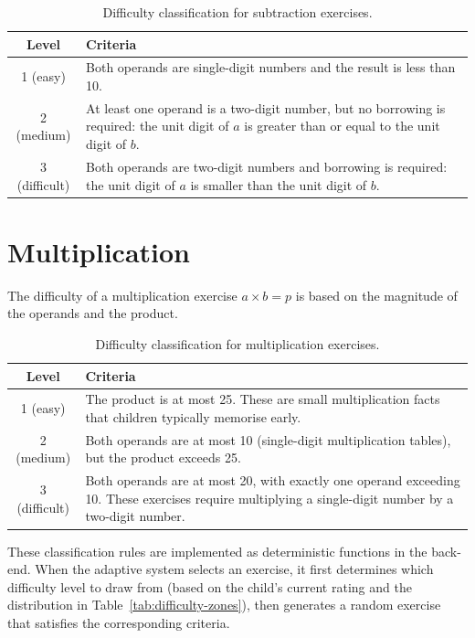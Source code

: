 \begin{table}[ht]
\centering
\begin{tabular}{cp{10cm}}
\toprule
Level & Criteria \\
\midrule
1 (easy) & Both operands are single-digit numbers and the result is less than 10. \\
2 (medium) & At least one operand is a two-digit number, but no borrowing is required: the unit digit of $a$ is greater than or equal to the unit digit of $b$. \\
3 (difficult) & Both operands are two-digit numbers and borrowing is required: the unit digit of $a$ is smaller than the unit digit of $b$. \\
\bottomrule
\end{tabular}
\caption{Difficulty classification for subtraction exercises.}
\label{tab:diff-subtraction}
\end{table}

\section{Multiplication}

The difficulty of a multiplication exercise $a \times b = p$ is based on the magnitude of the operands and the product.

\begin{table}[ht]
\centering
\begin{tabular}{cp{10cm}}
\toprule
Level & Criteria \\
\midrule
1 (easy) & The product is at most 25. These are small multiplication facts that children typically memorise early. \\
2 (medium) & Both operands are at most 10 (single-digit multiplication tables), but the product exceeds 25. \\
3 (difficult) & Both operands are at most 20, with exactly one operand exceeding 10. These exercises require multiplying a single-digit number by a two-digit number. \\
\bottomrule
\end{tabular}
\caption{Difficulty classification for multiplication exercises.}
\label{tab:diff-multiplication}
\end{table}

\noindent These classification rules are implemented as deterministic functions in the back-end. When the adaptive system selects an exercise, it first determines which difficulty level to draw from (based on the child's current rating and the distribution in Table~\ref{tab:difficulty-zones}), then generates a random exercise that satisfies the corresponding criteria.


